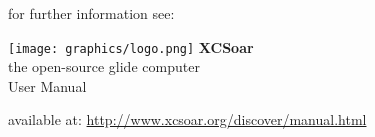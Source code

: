 \documentclass[english,a4paper,12pt]{refrep}
\begin{document}
\newpage
\pagestyle{empty}

\normalsize{for further information see:\\}
\vspace{0.5em}

\begin{center}
    \texttt{[image: graphics/logo.png]}
    \vskip 0.5cm
    \fontsize{50}{0}
    \selectfont\textbf{XCSoar}\\
    \fontsize{12}{12}
    \vspace{0.2em}
    \LARGE{the open-source glide computer}\\
    \vspace{1.2em}
    \LARGE{User Manual}\\
    
\vspace{9em}

\end{center}
\begin{flushright}
\normalsize available at: \url{http://www.xcsoar.org/discover/manual.html}\\
\end{flushright}
\end{document}
